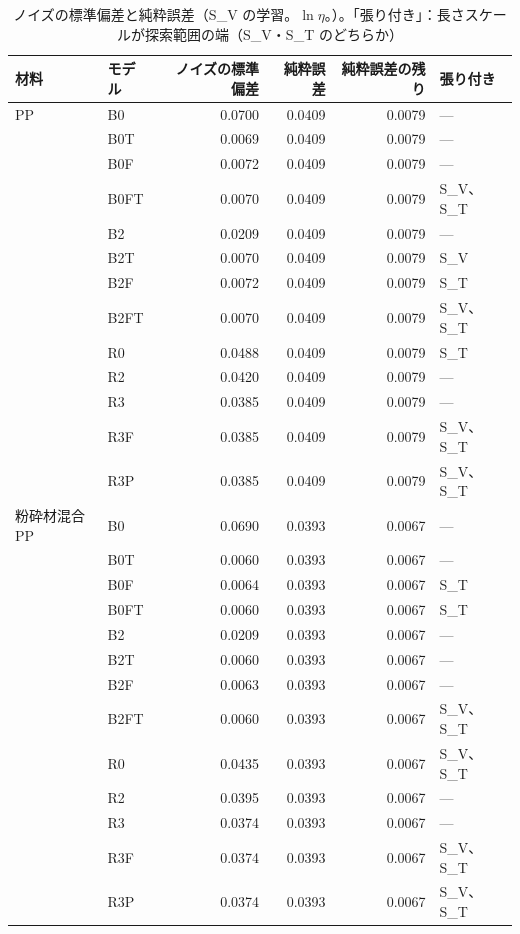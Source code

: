\documentclass[paper=a4paper,fontsize=10.5pt,line_length=44zw,number_of_lines=38]{jlreq}
\newcommand{\file}[1]{\texttt{\detokenize{#1}}}
\begin{document}
\begin{table}[H]
\caption{ノイズの標準偏差と純粋誤差（S\_V の学習。$\ln\eta$。\file{kernels.csv}）。「張り付き」：長さスケールが探索範囲の端（S\_V・S\_T のどちらか）}\label{tab:noise}
\begin{tabularx}{\linewidth}{@{}l>{\raggedright\arraybackslash}p{4\zw}rrrl@{}}
\toprule
材料 & モデル & ノイズの標準偏差 & 純粋誤差 & 純粋誤差の残り & 張り付き \\
\midrule
PP & B0 & 0.0700 & 0.0409 & 0.0079 & --- \\
 & B0T & 0.0069 & 0.0409 & 0.0079 & --- \\
 & B0F & 0.0072 & 0.0409 & 0.0079 & --- \\
 & B0FT & 0.0070 & 0.0409 & 0.0079 & S\_V、S\_T \\
 & B2 & 0.0209 & 0.0409 & 0.0079 & --- \\
 & B2T & 0.0070 & 0.0409 & 0.0079 & S\_V \\
 & B2F & 0.0072 & 0.0409 & 0.0079 & S\_T \\
 & B2FT & 0.0070 & 0.0409 & 0.0079 & S\_V、S\_T \\
 & R0 & 0.0488 & 0.0409 & 0.0079 & S\_T \\
 & R2 & 0.0420 & 0.0409 & 0.0079 & --- \\
 & R3 & 0.0385 & 0.0409 & 0.0079 & --- \\
 & R3F & 0.0385 & 0.0409 & 0.0079 & S\_V、S\_T \\
 & R3P & 0.0385 & 0.0409 & 0.0079 & S\_V、S\_T \\
粉砕材混合 PP & B0 & 0.0690 & 0.0393 & 0.0067 & --- \\
 & B0T & 0.0060 & 0.0393 & 0.0067 & --- \\
 & B0F & 0.0064 & 0.0393 & 0.0067 & S\_T \\
 & B0FT & 0.0060 & 0.0393 & 0.0067 & S\_T \\
 & B2 & 0.0209 & 0.0393 & 0.0067 & --- \\
 & B2T & 0.0060 & 0.0393 & 0.0067 & --- \\
 & B2F & 0.0063 & 0.0393 & 0.0067 & --- \\
 & B2FT & 0.0060 & 0.0393 & 0.0067 & S\_V、S\_T \\
 & R0 & 0.0435 & 0.0393 & 0.0067 & S\_V、S\_T \\
 & R2 & 0.0395 & 0.0393 & 0.0067 & --- \\
 & R3 & 0.0374 & 0.0393 & 0.0067 & --- \\
 & R3F & 0.0374 & 0.0393 & 0.0067 & S\_V、S\_T \\
 & R3P & 0.0374 & 0.0393 & 0.0067 & S\_V、S\_T \\
\bottomrule
\end{tabularx}
\end{table}
\end{document}
